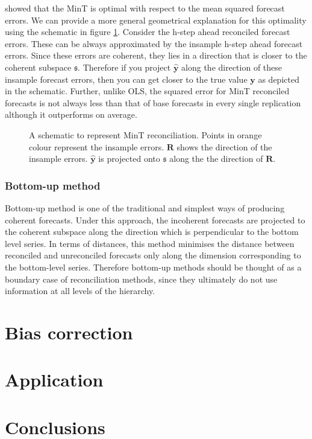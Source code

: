 \documentclass[12pt]{article}
\theoremstyle{definition}
\begin{document}
	\citet{Wickramasuriya2017} showed that the MinT is optimal with respect to the mean squared forecast errors. 
	We can provide a more general geometrical explanation for this optimality using the schematic in figure \ref{fig:MinT_justification}. Consider the h-step ahead reconciled forecast errors. These can be always approximated by the insample h-step ahead forecast errors. Since these errors are coherent, they lies in a direction that is closer to the coherent subspace $\mathfrak{s}$. Therefore if you project $\hat{\bm{y}}$ along the direction of these insample forecast errors, then you can get closer to the true value $\bm{y}$ as depicted in the schematic. Further, unlike OLS, the squared error for MinT reconciled forecasts is not always less than that of base forecasts in every single replication although it outperforms on average.


	 	
	 \begin{figure}[H]
	 		\centering
	 		\small
	 		\resizebox{\linewidth}{!}{
	 			
	 		}
	 		\caption{A schematic to represent MinT reconciliation. Points in orange colour represent the insample errors. $\bm{R}$ shows the direction of the insample errors. $\hat{\bm{y}}$ is projected onto $\mathfrak{s}$ along the the direction of $\bm{R}$.}\label{fig:MinT_justification}
	 \end{figure}
	
	\subsubsection{Bottom-up method}
	
	Bottom-up method is one of the traditional and simplest ways of producing coherent forecasts. Under this approach, the incoherent forecasts are projected to the coherent subspace along the direction which is perpendicular to the bottom level series. In terms of distances, this method minimises the distance between reconciled and unreconciled forecasts only along the dimension corresponding to the bottom-level series. Therefore bottom-up methods should be thought of as a boundary case of reconciliation methods, since they ultimately do not use information at all levels of the hierarchy.   
	
	
	\section{Bias correction}
	
	\section{Application}
	
	\section{Conclusions}
	
	\newpage
	
	
	
	
	
\end{document}

